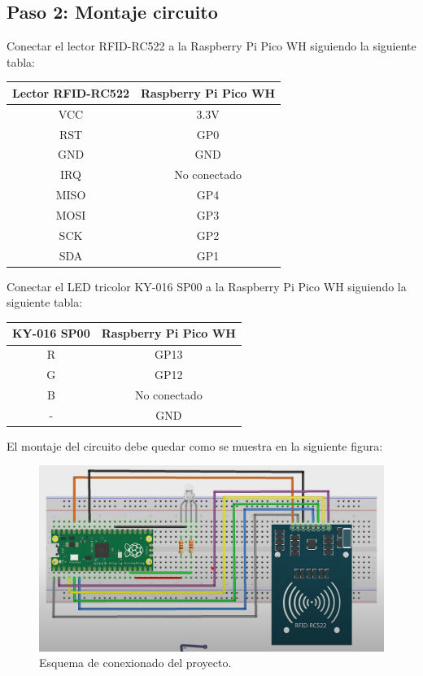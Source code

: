 \documentclass{article}
\begin{document}
\subsection{Paso 2: Montaje circuito}
Conectar el lector RFID-RC522 a la Raspberry Pi Pico WH siguiendo la siguiente tabla:

\begin{center}
	\begin{tabular}{|c|c|}
		\hline
		\textbf{Lector RFID-RC522} & \textbf{Raspberry Pi Pico WH} \\
		\hline
		VCC & 3.3V \\
		\hline
		RST & GP0 \\
		\hline
		GND & GND \\
		\hline
		IRQ & No conectado \\
		\hline
		MISO & GP4 \\
		\hline
		MOSI & GP3 \\
		\hline
		SCK & GP2 \\
		\hline
		SDA & GP1 \\
		\hline
	\end{tabular}
\end{center}

\vspace{0.3cm}

Conectar el LED tricolor KY-016 SP00 a la Raspberry Pi Pico WH siguiendo la siguiente tabla:
\begin{center}
	\begin{tabular}{|c|c|}
		\hline
		\textbf{KY-016 SP00} & \textbf{Raspberry Pi Pico WH} \\
		\hline
		R & GP13 \\
		\hline
		G & GP12 \\
		\hline
		B & No conectado \\
		\hline
		- & GND \\
		\hline
	\end{tabular}
\end{center}



El montaje del circuito debe quedar como se muestra en la siguiente figura:
\begin{figure}[H]
	\centering
	\includegraphics[width=1\linewidth]{../images/esquema_de_conexionado.png}
	\caption{\label{fig:circuito}Esquema de conexionado del proyecto.}
\end{figure}
\end{document}
